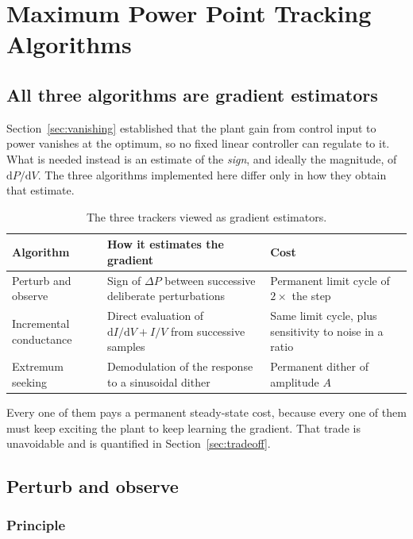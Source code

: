 \chapter{Maximum Power Point Tracking Algorithms}
\label{ch:mppt}

\section{All three algorithms are gradient estimators}

Section~\ref{sec:vanishing} established that the plant gain from control input
to power vanishes at the optimum, so no fixed linear controller can regulate to
it. What is needed instead is an estimate of the \emph{sign}, and ideally the
magnitude, of $\mathrm{d}P/\mathrm{d}V$. The three algorithms implemented here
differ only in how they obtain that estimate.

\begin{table}[htbp]
\centering
\caption{The three trackers viewed as gradient estimators.}
\label{tab:estimators}
\begin{tabular}{@{}p{}p{}p{}@{}}
\toprule
\textbf{Algorithm} & \textbf{How it estimates the gradient} & \textbf{Cost} \\
\midrule
Perturb and observe & Sign of $\Delta P$ between successive deliberate perturbations & Permanent limit cycle of $2\times$ the step \\
Incremental conductance & Direct evaluation of $\mathrm{d}I/\mathrm{d}V + I/V$ from successive samples & Same limit cycle, plus sensitivity to noise in a ratio \\
Extremum seeking & Demodulation of the response to a sinusoidal dither & Permanent dither of amplitude $A$ \\
\bottomrule
\end{tabular}
\end{table}

Every one of them pays a permanent steady-state cost, because every one of them
must keep exciting the plant to keep learning the gradient. That trade is
unavoidable and is quantified in Section~\ref{sec:tradeoff}.

\section{Perturb and observe}

\subsection{Principle}


